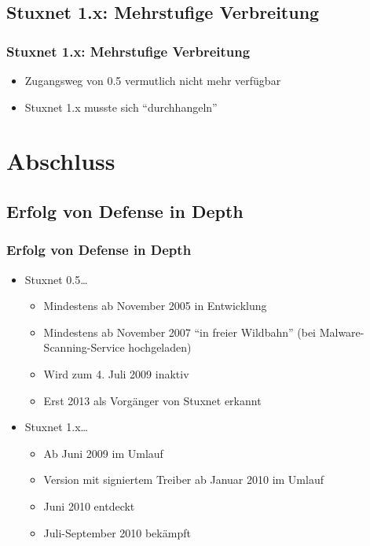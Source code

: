 \documentclass{beamer}
\begin{document}
\subsection{Stuxnet 1.x: Mehrstufige Verbreitung}

\begin{frame}
  \frametitle{Stuxnet 1.x: Mehrstufige Verbreitung}
  \begin{itemize}
    \item Zugangsweg von 0.5 vermutlich nicht mehr verfügbar
    \item Stuxnet 1.x musste sich ``durchhangeln''
  \end{itemize}
\end{frame}

\section{Abschluss}

\subsection{Erfolg von Defense in Depth}

\begin{frame}
  \frametitle{Erfolg von Defense in Depth}
  \begin{itemize}
    \item Stuxnet 0.5\dots
      \begin{itemize}
        \item Mindestens ab November 2005 in Entwicklung
        \item Mindestens ab November 2007 ``in freier Wildbahn'' (bei Malware-Scanning-Service hochgeladen)
        \item Wird zum 4. Juli 2009 inaktiv
        \item Erst 2013 als Vorgänger von Stuxnet erkannt
      \end{itemize}
    \item Stuxnet 1.x\dots
      \begin{itemize}
        \item Ab Juni 2009 im Umlauf
        \item Version mit signiertem Treiber ab Januar 2010 im Umlauf
        \item Juni 2010 entdeckt
        \item Juli-September 2010 bekämpft
      \end{itemize}
  \end{itemize}
\end{frame}
\end{document}
